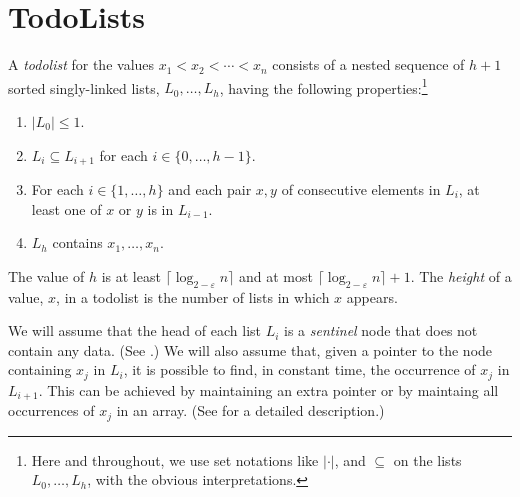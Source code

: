 \documentclass{patmorin}
\begin{document}
\section{TodoLists}

A \emph{todolist} for the values $x_1<x_2<\cdots<x_n$ consists of a
nested sequence of $h+1$ sorted singly-linked lists, $L_0,\ldots,L_h$,
having the following properties:\footnote{Here and throughout, we use set
notations like $|\cdot|$, and $\subseteq$ on the lists $L_0,\ldots,L_h$,
with the obvious interpretations.}

\begin{enumerate}
  \item $|L_0| \le 1$.
  \item $L_i\subseteq L_{i+1}$ for each $i\in\{0,\ldots,h-1\}$.
  \item For each $i\in\{1,\ldots,h\}$ and each pair $x,y$ of consecutive
        elements in $L_i$, at least one of $x$ or $y$ is in $L_{i-1}$.
  \item $L_h$ contains $x_1,\ldots,x_n$.
\end{enumerate}

The value of $h$ is at least $\lceil \log_{2-\varepsilon} n\rceil$ and
at most $\lceil \log_{2-\varepsilon} n\rceil+1$.  The \emph{height} of
a value, $x$, in a todolist is the number of lists in which $x$ appears.

We will assume that the head of each list $L_i$ is a \emph{sentinel} node that does not contain any data. (See .)  We will also
assume that, given a pointer to the node containing $x_j$ in $L_i$, it is
possible to find, in constant time, the occurrence of $x_j$ in $L_{i+1}$.
This can be achieved by maintaining an extra pointer or by maintaing
all occurrences of $x_j$ in an array. (See  for
a detailed description.)
\end{document}
